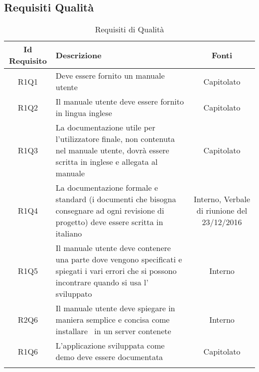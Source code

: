 \newpage
\subsection{Requisiti Qualità}
\normalsize
\begingroup
\renewcommand\arraystretch{2}
\begin{longtable}{|c|>{\centering}m{7cm}|c|}
\hline
\textbf{Id Requisito} & \textbf{Descrizione} & \textbf{Fonti}\\
\hline
\endhead
			R1Q1 & Deve essere fornito un manuale utente & Capitolato \\
			\hline
			R1Q2 & Il manuale utente deve essere fornito in lingua inglese & Capitolato \\
			\hline
			R1Q3 & La documentazione utile per l'utilizzatore finale, non contenuta nel manuale utente, dovrà essere scritta in inglese e allegata al manuale  & Capitolato \\ 
			\hline
			R1Q4 & La documentazione formale e standard (i documenti che bisogna consegnare ad ogni revisione di progetto) deve essere scritta in italiano  & Interno, Verbale di riunione del 23/12/2016\\ 
			\hline
			R1Q5 & Il manuale utente deve contenere una parte dove vengono specificati e spiegati  i vari errori che si possono incontrare quando si usa l'\termine{SDK} sviluppato & Interno \\ 
			\hline
			R2Q6 & Il manuale utente deve spiegare in maniera semplice e concisa come installare \progettoShort\ in un server contenete \termine{Rocket.chat} & Interno \\ 
			\hline
			R1Q6 & L'applicazione sviluppata come demo deve essere documentata & Capitolato \\ 
			\hline
\caption[Requisiti di Qualità]{Requisiti di Qualità}
\label{tabella: Requisiti Funzionali}
\end{longtable}
\endgroup
\clearpage